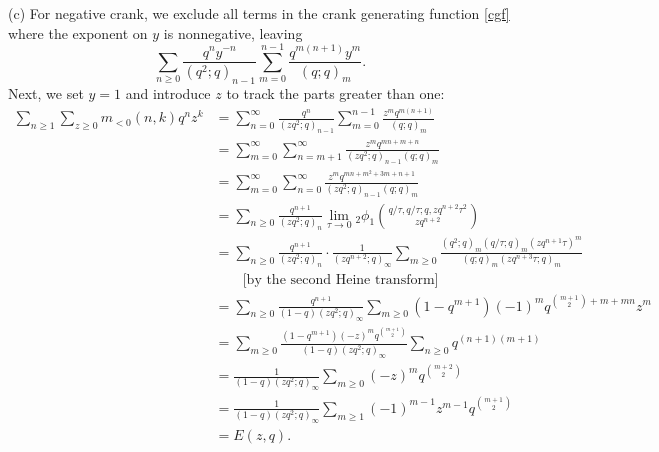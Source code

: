 \documentclass{amsart}
\theoremstyle{theorem}
\theoremstyle{definition}
\begin{document}
(c) For negative crank, we exclude all terms in the crank generating function \eqref{cgf} where the exponent on $y$ is nonnegative, leaving
\[ \sum_{n \ge 0} \frac{q^n y^{-n}}{(q^2;q)_{n-1}} \sum_{m =0 }^{n-1} \frac{q^{m(n+1)} y^m}{(q;q)_m}. \]
Next, we set $y=1$ and introduce $z$ to track the parts greater than one:
\begin{align*}
 \sum_{n \ge 1} \sum_{z \ge 0} m_{<0}(n,k) q^n z^k & = \sum_{n = 0}^\infty \frac{q^n}{(zq^2;q)_{n-1}} \sum_{m =0 }^{n-1} \frac{z^m q^{m(n+1)}}{(q;q)_m} \\
& = \sum_{m = 0}^\infty \sum_{n = m+1}^\infty \frac{z^m q^{mn+m+n}}{(zq^2;q)_{n-1}(q;q)_m} \\
& = \sum_{m = 0}^\infty \sum_{n = 0}^\infty \frac{z^m q^{mn+m^2+3m+n+1}}{(zq^2;q)_{n-1}(q;q)_m} \\
& = \sum_{n \ge 0} \frac{q^{n+1}}{(zq^2;q)_{n}} \lim_{\tau \to 0} {}_2\phi_1\binom{q/\tau, q/\tau; q, zq^{n+2}\tau^2}{zq^{n+2}} \\
& = \sum_{n \ge 0} \frac{q^{n+1}}{(zq^2;q)_{n}} \cdot \frac{1}{(zq^{n+2};q)_\infty} \sum_{m \ge 0} \frac{(q^2;q)_m (q/\tau;q)_m (zq^{n+1}\tau)^m}{(q;q)_m (z q^{n+3}\tau;q)_m} \\
& \qquad \text{[by the second Heine transform]} \\
& =  \sum_{n \ge 0} \frac{q^{n+1}}{(1-q)(zq^2;q)_\infty} \sum_{m \ge 0} (1-q^{m+1}) (-1)^m q^{\binom{m+1}{2} + m + mn} z^m \\
& =  \sum_{m \ge 0} \frac{(1-q^{m+1})(-z)^m q^{\binom{m+1}{2}}}{(1-q)(zq^2;q)_\infty} \sum_{n \ge 0} q^{(n+1)(m+1)} \\
& =  \frac{1}{(1-q)(zq^2;q)_\infty} \sum_{m \ge 0}  (-z)^m q^{\binom{m+2}{2}} \\
& =  \frac{1}{(1-q)(zq^2;q)_\infty} \sum_{m \ge 1}  (-1)^{m-1} z^{m-1} q^{\binom{m+1}{2}} \\
& = E(z,q).
 \end{align*}
 
\end{document}
